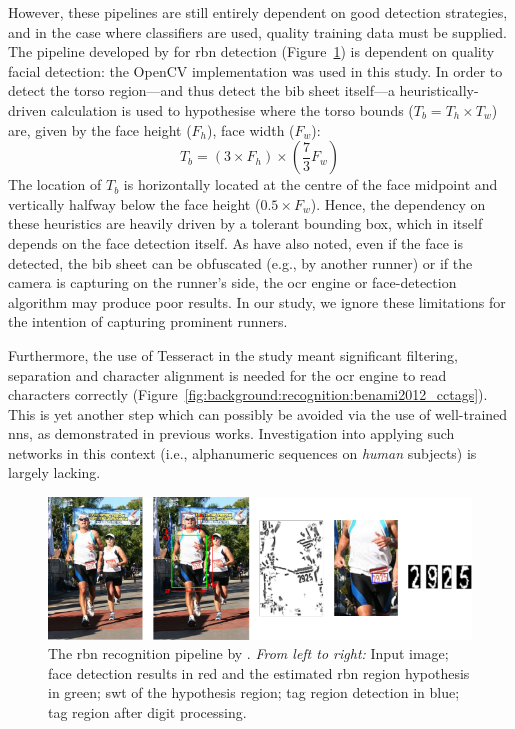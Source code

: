 However, these pipelines are still entirely dependent on good detection strategies, and in the case where classifiers are used, quality training data must be supplied. The pipeline developed by \citet{Benami:2012jf} for \gls{rbn} detection (Figure~\ref{fig:background:recognition:benami2012_pipeline}) is dependent on quality facial detection: the OpenCV implementation \citep{Lienhart:2002uo} was used in this study. In order to detect the torso region---and thus detect the bib sheet itself---a heuristically-driven calculation is used to hypothesise where the torso bounds ($T_{b} = T_{h} \times T_{w}$) are, given by the face height ($F_{h}$), face width ($F_{w}$):
\begin{equation*}
  T_{b} = (3 \times F_{h}) \times (\frac{7}{3} F_{w})
\end{equation*}
The location of $T_{b}$ is horizontally located at the centre of the face midpoint and vertically halfway below the face height ($0.5 \times F_{w}$). Hence, the dependency on these heuristics are heavily driven by a tolerant bounding box, which in itself depends on the face detection itself. As \citet{Fu:2015by} have also noted, even if the face is detected, the bib sheet can be obfuscated (e.g., by another runner) or if the camera is capturing on the runner's side, the \gls{ocr} engine or face-detection algorithm may produce poor results. In our study, we ignore these limitations for the intention of capturing prominent runners.

Furthermore, the use of Tesseract in the study meant significant filtering, separation and character alignment is needed for the \gls{ocr} engine to read characters correctly (Figure~\ref{fig:background:recognition:benami2012_cctags}). This is yet another step which can possibly be avoided via the use of well-trained \glspl{nn}, as demonstrated in previous works. Investigation into applying such networks in this context (i.e., alphanumeric sequences on \textit{human} subjects) is largely lacking.

\begin{figure}[h]
  \centering
  \includegraphics[width=\textwidth]{images/background/benami2012_pipeline}
  \caption[Text recognition pipelines dependent on heuristics]{The \gls{rbn} recognition pipeline by \citet{Benami:2012jf}. \textit{From left to right:} Input image; face detection results in red and the estimated \gls{rbn} region hypothesis in green; \gls{swt} of the hypothesis region; tag region detection in blue; tag region after digit processing.}
  \label{fig:background:recognition:benami2012_pipeline}
\end{figure}

